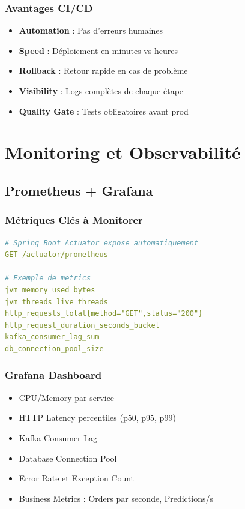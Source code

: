 \documentclass[12pt,a4paper,twoside]{report}
\begin{document}
\subsection{Avantages CI/CD}
\begin{itemize}
    \item \textbf{Automation} : Pas d'erreurs humaines
    \item \textbf{Speed} : Déploiement en minutes vs heures
    \item \textbf{Rollback} : Retour rapide en cas de problème
    \item \textbf{Visibility} : Logs complètes de chaque étape
    \item \textbf{Quality Gate} : Tests obligatoires avant prod
\end{itemize}

\chapter{Monitoring et Observabilité}

\section{Prometheus + Grafana}

\subsection{Métriques Clés à Monitorer}

\begin{lstlisting}[language=yaml]
# Spring Boot Actuator expose automatiquement
GET /actuator/prometheus

# Exemple de metrics
jvm_memory_used_bytes
jvm_threads_live_threads
http_requests_total{method="GET",status="200"}
http_request_duration_seconds_bucket
kafka_consumer_lag_sum
db_connection_pool_size
\end{lstlisting}

\subsection{Grafana Dashboard}

\begin{itemize}
    \item CPU/Memory par service
    \item HTTP Latency percentiles (p50, p95, p99)
    \item Kafka Consumer Lag
    \item Database Connection Pool
    \item Error Rate et Exception Count
    \item Business Metrics : Orders par seconde, Predictions/s
\end{itemize}
\end{document}
